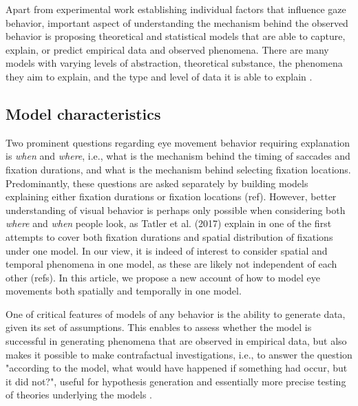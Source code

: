 \documentclass{article}
\begin{document}
Apart from experimental work establishing individual factors that influence gaze behavior, important aspect of understanding the mechanism behind the observed behavior is proposing theoretical and statistical models that are able to capture, explain, or predict empirical data and observed phenomena. There are many models with varying levels of abstraction, theoretical substance, the phenomena they aim to explain, and the type and level of data it is able to explain \citep{tatler2017latest,trukenbrod2014icat,nuthmann2017fixation_durations,zelinsky2013modelling,schutt2017likelihood,schwetlick2020ccenewalk_extendeds,le_meur2015saccadic,malem2020exploration}. 

\subsection{Model characteristics}

Two prominent questions regarding eye movement behavior requiring explanation is \textit{when} and \textit{where}, i.e., what is the mechanism behind the timing of saccades and fixation durations, and what is the mechanism behind selecting fixation locations. Predominantly, these questions are asked separately by building models explaining either fixation durations or fixation locations (ref). However, better understanding of visual behavior is perhaps only possible when considering both \textit{where} and \textit{when} people look, as Tatler et al. (2017) explain in one of the first attempts to cover both fixation durations and spatial distribution of fixations under one model. In our view, it is indeed of interest to consider spatial and temporal phenomena in one model, as these are likely not independent of each other (refs). In this article, we propose a new account of how to model eye movements both spatially and temporally in one model.

One of critical features of models of any behavior is the ability to generate data, given its set of assumptions. This enables to assess whether the model is successful in generating phenomena that are observed in empirical data, but also makes it possible to make contrafactual investigations, i.e., to answer the question "according to the model, what would have happened if something had occur, but it did not?", useful for hypothesis generation and essentially more precise testing of theories underlying the models \citep{nuthmann2010crisp}.
\end{document}
